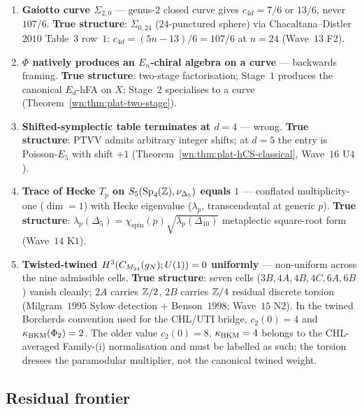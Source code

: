 \begin{theorem}
\begin{enumerate}
\item \textbf{Gaiotto curve $\Sigma_{2,0}$} \ClaimStatusRetracted ---
genus-$2$ closed curve gives $c_{4d} = 7/6$ or $13/6$, never $107/6$.
\textbf{True structure}: $\Sigma_{0, 24}$ ($24$-punctured sphere) via
Chacaltana--Distler~$2010$ Table~$3$ row~$1$: $c_{4d} = (5n - 13)/6 = 107/6$
at $n = 24$ (Wave~$13$ F$2$).

\item \textbf{$\Phi$ natively produces an $E_n$-chiral algebra on a curve}
\ClaimStatusCorrected --- backwards framing. \textbf{True structure}:
two-stage factorisation; Stage~$1$ produces the canonical $E_d$-hFA on $X$;
Stage~$2$ specialises to a curve
(Theorem~\ref{wn:thm:plat-two-stage}).

\item \textbf{Shifted-symplectic table terminates at $d = 4$}
\ClaimStatusCorrected --- wrong.
\textbf{True structure}: PTVV admits arbitrary integer shifts; at $d = 5$
the entry is Poisson-$E_5$ with shift $+1$
(Theorem~\ref{wn:thm:plat-hCS-classical}, Wave~$16$ U$4$).

\item \textbf{Trace of Hecke $T_p$ on $S_5(\mathrm{Sp}_4(\mathbb{Z}), \nu_{\Delta_5})$
equals $1$} \ClaimStatusCorrected --- conflated multiplicity-one
($\dim = 1$) with Hecke eigenvalue ($\lambda_p$, transcendental at
generic $p$). \textbf{True structure}:
$\lambda_p(\Delta_5) = \chi_{\mathrm{spin}}(p)\sqrt{\lambda_p(\Delta_{10})}$
metaplectic square-root form (Wave~$14$ K$1$).

\item \textbf{Twisted-twined $H^3(C_{M_{24}}(g_N); U(1)) = 0$ uniformly}
\ClaimStatusCorrected --- non-uniform across the nine admissible cells.
\textbf{True structure}: seven cells ($3B, 4A, 4B, 4C, 6A, 6B$) vanish
cleanly; $2A$ carries $\mathbb{Z}/2$, $2B$ carries $\mathbb{Z}/4$ residual discrete
torsion (Milgram~$1995$ Sylow detection + Benson~$1998$; Wave~$15$ N$2$).
In the twined Borcherds convention used for the CHL/UTI bridge,
$c_2(0)=4$ and $\kappa_{\mathrm{BKM}}(\Phi_2)=2$.  The older value
$c_2(0)=8$, $\kappa_{\mathrm{BKM}}=4$ belongs to the CHL-averaged Family-(i)
normalisation and must be labelled as such; the torsion dresses the
paramodular multiplier, not the canonical twined weight.
\end{enumerate}
\end{theorem}

\subsection{Residual frontier}
\label{wn:subsec:plat-frontier}

